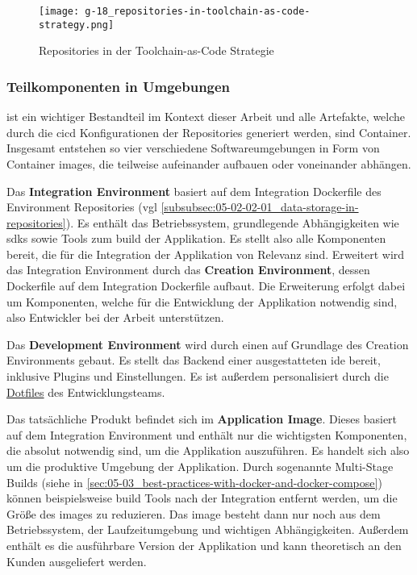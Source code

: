 \begin{figure}[htp]
    \centering
    \texttt{[image: g-18\_repositories-in-toolchain-as-code-strategy.png]}
    \caption{Repositories in der Toolchain-as-Code Strategie}
    \label{fig:g-18_repositories-in-toolchain-as-code-strategy}
\end{figure}

\subsubsection{Teilkomponenten in Umgebungen}
\label{subsubsec:05-02-02-02_sub-components-in-environments}

 ist ein wichtiger Bestandteil im Kontext dieser Arbeit und alle Artefakte, welche durch die \Gls{cicd} Konfigurationen der Repositories generiert werden, sind Container. Insgesamt entstehen so vier verschiedene Softwareumgebungen in Form von Container \Glspl{image}, die teilweise aufeinander aufbauen oder voneinander abhängen.

Das \textbf{Integration Environment} basiert auf dem Integration Dockerfile des Environment Repositories (\acrshort{vgl} \autoref{subsubsec:05-02-02-01_data-storage-in-repositories}). Es enthält das Betriebssystem, grundlegende Abhängigkeiten wie \Glspl{sdk} sowie Tools zum \Gls{build} der Applikation. Es stellt also alle Komponenten bereit, die für die Integration der Applikation von Relevanz sind. Erweitert wird das Integration Environment durch das \textbf{Creation Environment}, dessen Dockerfile auf dem Integration Dockerfile aufbaut. Die Erweiterung erfolgt dabei um Komponenten, welche für die Entwicklung der Applikation notwendig sind, also Entwickler bei der Arbeit unterstützen.

Das \textbf{Development Environment} wird durch einen  auf Grundlage des Creation Environments gebaut. Es stellt das Backend einer ausgestatteten \Gls{ide} bereit, inklusive Plugins und Einstellungen. Es ist außerdem personalisiert durch die \hyperref[sec:03-04_idea-of-dotfiles]{Dotfiles} des Entwicklungsteams.

Das tatsächliche Produkt befindet sich im \textbf{Application Image}. Dieses basiert auf dem Integration Environment und enthält nur die wichtigsten Komponenten, die absolut notwendig sind, um die Applikation auszuführen. Es handelt sich also um die produktive Umgebung der Applikation. Durch sogenannte Multi-Stage Builds (siehe  in \autoref{sec:05-03_best-practices-with-docker-and-docker-compose}) können beispielsweise \Gls{build} Tools nach der Integration entfernt werden, um die Größe des \Glspl{image} zu reduzieren. Das \Gls{image} besteht dann nur noch aus dem Betriebssystem, der Laufzeitumgebung und wichtigen Abhängigkeiten. Außerdem enthält es die ausführbare Version der Applikation und kann theoretisch an den Kunden ausgeliefert werden.

